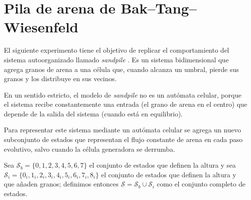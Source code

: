 \section{Pila de arena de Bak–Tang–Wiesenfeld}\label{sec:exp1_sandpile}

El siguiente experimento tiene el objetivo de replicar el comportamiento del sistema autoorganizado llamado \textit{sandpile} \cite{bak1987}. Es un sistema bidimensional que agrega granos de arena a una célula que, cuando alcanza un umbral, pierde sus granos y los distribuye en sus vecinos.

En un sentido estricto, el modelo de \textit{sandpile} no es un autómata celular, porque el sistema recibe constantemente una entrada (el grano de arena en el centro) que depende de la salida del sistema (cuando está en equilibrio). 

Para representar este sistema mediante un autómata celular se agrega un nuevo subconjunto de estados que representan el flujo constante de arena en cada paso evolutivo, salvo cuando la célula generadora se derrumba. 

Sea $\mathcal{S}_b = \{0,1,2,3,4, 5, 6, 7\}$ el conjunto de estados que definen la altura y sea $\mathcal{S}_i = \{ 0_i, 1_i, 2_i, 3_i, 4_i, 5_i, 6_i, 7_i, 8_i\}$ el conjunto de estados que definen la altura y que añaden granos; definimos entonces $\mathcal{S} = \mathcal{S}_b \cup \mathcal{S}_i$ como el conjunto completo de estados. 

